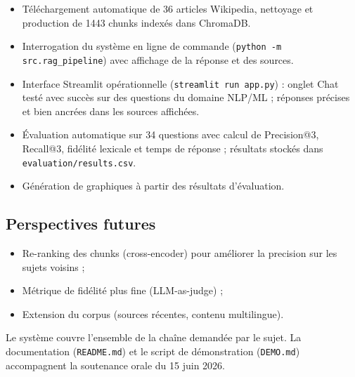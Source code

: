 \begin{itemize}[noitemsep]
  \item T\'el\'echargement automatique de 36 articles Wikipedia, nettoyage et production de
        1443 chunks index\'es dans ChromaDB.
  \item Interrogation du syst\`eme en ligne de commande
        (\texttt{python -m src.rag\_pipeline}) avec affichage de la r\'eponse et des sources.
  \item Interface Streamlit op\'erationnelle (\texttt{streamlit run app.py}) : onglet Chat test\'e
        avec succ\`es sur des questions du domaine NLP/ML ; r\'eponses pr\'ecises et bien ancr\'ees
        dans les sources affich\'ees.
  \item \'Evaluation automatique sur 34 questions avec calcul de Precision@3, Recall@3,
        fid\'elit\'e lexicale et temps de r\'eponse ; r\'esultats stock\'es dans
        \texttt{evaluation/results.csv}.
  \item G\'en\'eration de graphiques \`a partir des r\'esultats d'\'evaluation.
\end{itemize}

\subsection{Perspectives futures}

\begin{itemize}[noitemsep]
  \item Re-ranking des chunks (cross-encoder) pour am\'eliorer la precision sur les sujets
        voisins ;
  \item M\'etrique de fid\'elit\'e plus fine (LLM-as-judge) ;
  \item Extension du corpus (sources r\'ecentes, contenu multilingue).
\end{itemize}

Le syst\`eme couvre l'ensemble de la cha\^ine demand\'ee par le sujet. La documentation
(\texttt{README.md}) et le script de d\'emonstration (\texttt{DEMO.md}) accompagnent la
soutenance orale du 15 juin 2026.
